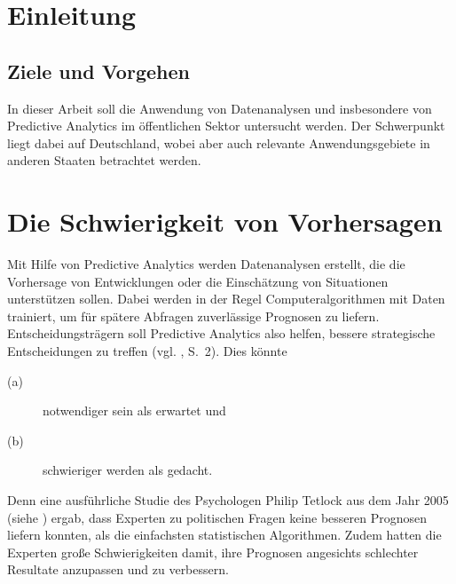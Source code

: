 \chapter{Einleitung}
\label{part:Einleitung}

\section{Ziele und Vorgehen}

In dieser Arbeit soll die Anwendung von Datenanalysen und insbesondere
von Predictive Analytics im öffentlichen Sektor untersucht
werden.
Der Schwerpunkt liegt dabei auf Deutschland, wobei aber auch relevante
Anwendungsgebiete in anderen Staaten betrachtet werden.





\chapter{Die Schwierigkeit von Vorhersagen}
\label{part:Schw_Vorhersagen}

Mit Hilfe von Predictive Analytics werden Datenanalysen
erstellt, die die Vorhersage von Entwicklungen oder die Einschätzung von
Situationen unterstützen sollen. Dabei werden in der Regel Computeralgorithmen
mit Daten trainiert, um für spätere Abfragen zuverlässige Prognosen zu liefern.
Entscheidungsträgern soll Predictive Analytics also helfen, bessere
strategische Entscheidungen zu treffen (vgl. \cite{Mauerer}, S.~2). %
Dies könnte
\begin{description}
\item[(a)] notwendiger sein als erwartet und
\item[(b)] schwieriger werden als gedacht.
\end{description}
Denn eine ausführliche Studie des Psychologen Philip Tetlock aus dem Jahr 2005
(siehe \cite{Tetlock}) ergab,
dass Experten zu politischen Fragen keine besseren Prognosen liefern konnten,
als die einfachsten statistischen Algorithmen. Zudem hatten die Experten
große Schwierigkeiten damit, ihre Prognosen angesichts schlechter Resultate
anzupassen und zu verbessern.

